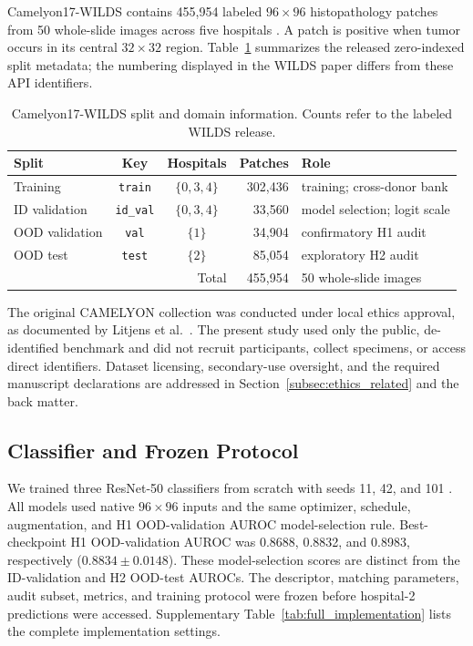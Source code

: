 \documentclass[notspecified,article,submit,moreauthors]{Definitions/mdpi}
\begin{document}
Camelyon17-WILDS contains 455,954 labeled $96\times96$ histopathology patches
from 50 whole-slide images across five hospitals
\cite{bandi2018camelyon17,koh2021wilds,litjens2018camelyon}. A patch is positive
when tumor occurs in its central $32\times32$ region. Table~\ref{tab:dataset_splits}
summarizes the released zero-indexed split metadata; the numbering displayed in
the WILDS paper differs from these API identifiers.

\begin{table}[H]
\caption{Camelyon17-WILDS split and domain information. Counts refer to the
labeled WILDS release.}
\label{tab:dataset_splits}
\centering
\scriptsize
\setlength{\tabcolsep}{3.2pt}
\begin{tabularx}{\columnwidth}{@{}lccrX@{}}
\toprule
Split & Key & Hospitals & Patches & Role \\
\midrule
Training & \texttt{train} & $\{0,3,4\}$ & 302,436 & training; cross-donor bank \\
ID validation & \texttt{id\_val} & $\{0,3,4\}$ & 33,560 & model selection; logit scale \\
OOD validation & \texttt{val} & $\{1\}$ & 34,904 & confirmatory H1 audit \\
OOD test & \texttt{test} & $\{2\}$ & 85,054 & exploratory H2 audit \\
\midrule
\multicolumn{3}{r}{Total} & 455,954 & 50 whole-slide images \\
\bottomrule
\end{tabularx}
\end{table}

The original CAMELYON collection was conducted under local ethics approval,
as documented by Litjens et al.~\cite{litjens2018camelyon}. The present study
used only the public, de-identified benchmark and did not recruit participants,
collect specimens, or access direct identifiers. Dataset licensing, secondary-use
oversight, and the required manuscript declarations are addressed in
Section~\ref{subsec:ethics_related} and the back matter.

\subsection{Classifier and Frozen Protocol}

We trained three ResNet-50 classifiers from scratch with seeds 11, 42, and 101
\cite{he2016resnet}. All models used native $96\times96$ inputs and the same
optimizer, schedule, augmentation, and H1 OOD-validation AUROC model-selection
rule. Best-checkpoint H1 OOD-validation AUROC was 0.8688, 0.8832, and 0.8983,
respectively ($0.8834\pm0.0148$). These model-selection scores are distinct
from the ID-validation and H2 OOD-test AUROCs. The descriptor, matching
parameters, audit subset, metrics, and training protocol were frozen before
hospital-2 predictions were accessed. Supplementary
Table~\ref{tab:full_implementation} lists the complete implementation settings.
\end{document}
